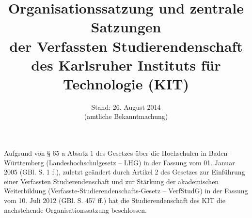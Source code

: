 


\usepackage{scrlayer-scrpage}
\pagestyle{scrheadings}
\automark*[section]{}

\makeatletter
\renewcommand\partheadstartvskip{\cleardoublepage%
	\thispagestyle{empty}%
	\null\vfil%
}
\newcommand*{\setpartpreamble}[1]{\def\@partpreamble{#1}}
\renewcommand\partheadmidvskip{\par\nobreak\vskip 20pt}
\renewcommand\partheadendvskip{\bigskip\@partpreamble\vfil\newpage}
\renewcommand\raggedpart{\centering}
\makeatother


\title{Organisationssatzung und zentrale Satzungen\\der Verfassten Studierendenschaft\\des Karlsruher Instituts für Technologie (KIT)}
\date{Stand: 26. August 2014\\(amtliche Bekanntmachung)}

\makeatletter
{}
\makeatother





\maketitle

\cleardoublepage

\begin{multicols}{2}
\tableofcontents
\end{multicols}

\bigskip

Aufgrund von § 65 a Absatz 1 des Gesetzes über die Hochschulen in Baden-Württemberg (Landeshochschulgesetz -- LHG) in der Fassung vom 01. Januar 2005 (GBl. S. 1 f.), zuletzt geändert durch Artikel 2 des Gesetzes zur Einführung einer Verfassten Studierendenschaft und zur Stärkung der akademischen Weiterbildung (Verfasste-Studierendenschafts-Gesetz -- VerfStudG) in der Fassung vom 10. Juli 2012 (GBl. S. 457 ff.) hat die Studierendenschaft des KIT die nachstehende Organisationssatzung beschlossen.

